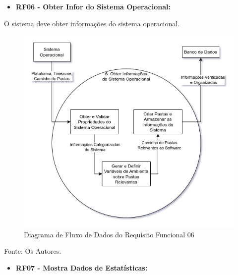 \documentclass[a4paper,12pt]{article}
\begin{document}
\pagebreak
\begin{itemize}
\item\textbf{RF06 - Obter Infor do Sistema Operacional:}
\end{itemize}

O sistema deve obter informações do sistema operacional.
\begin{figure}[H]
	\centering
	\includegraphics[scale=0.45]{DFDs/RF06.drawio.png}
	\caption{Diagrama de Fluxo de Dados do Requisito Funcional 06}
\end{figure}
\noindent Fonte: Os Autores.

\pagebreak
\begin{itemize}
\item\textbf{RF07 - Mostra Dados de Estatísticas:}
\end{itemize}
\end{document}
